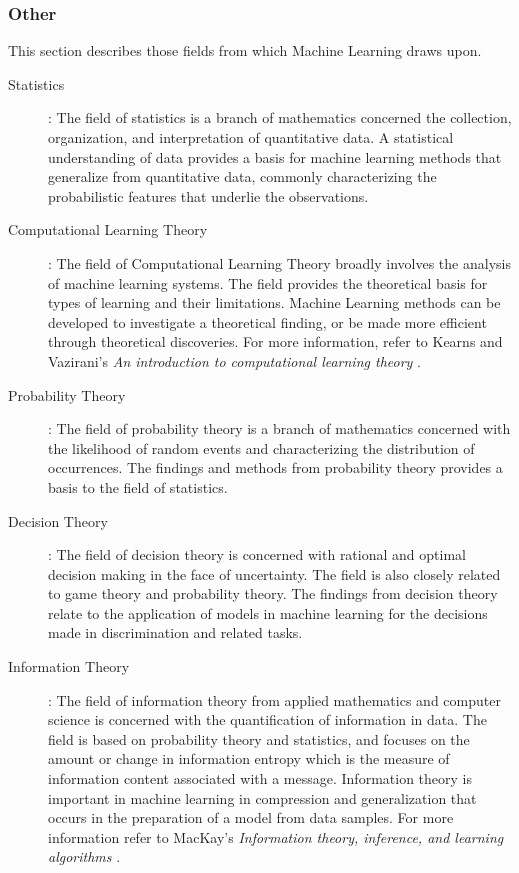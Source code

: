 \subsubsection{Other}
This section describes those fields from which Machine Learning draws upon. 

\begin{description}
	\item[Statistics]: The field of statistics is a branch of mathematics concerned the collection, organization, and interpretation of quantitative data. A statistical understanding of data provides a basis for machine learning methods that generalize from quantitative data, commonly characterizing the probabilistic features that underlie the observations.
	
	\item[Computational Learning Theory]: The field of Computational Learning Theory broadly involves the analysis of machine learning systems. The field provides the theoretical basis for types of learning and their limitations. Machine Learning methods can be developed to investigate a theoretical finding, or be made more efficient through theoretical discoveries. For more information, refer to Kearns and Vazirani's \emph{An introduction to computational learning theory} \cite{Kearns1994}.
	
	\item[Probability Theory]: The field of probability theory is a branch of mathematics concerned with the likelihood of random events and characterizing the distribution of occurrences. The findings and methods from probability theory provides a basis to the field of statistics. 
	
	\item[Decision Theory]: The field of decision theory is concerned with rational and optimal decision making in the face of uncertainty. The field is also closely related to game theory and probability theory. The findings from decision theory relate to the application of models in machine learning for the decisions made in discrimination and related tasks.
	
	\item[Information Theory]:	The field of information theory from applied mathematics and computer science is concerned with the quantification of information in data. The field is based on probability theory and statistics, and focuses on the amount or change in information entropy which is the measure of information content associated with a message. Information theory is important in machine learning in compression and generalization that occurs in the preparation of a model from data samples. For more information refer to MacKay's \emph{Information theory, inference, and learning algorithms} \cite{MacKay2003}.
\end{description}

